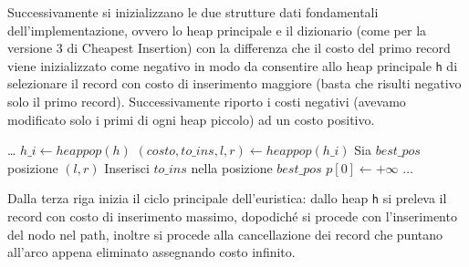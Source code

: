 \documentclass[a4paper,12pt]{report}
\begin{document}
Successivamente si inizializzano le due strutture dati fondamentali dell'implementazione, ovvero lo heap principale e il dizionario (come per la versione 3 di Cheapest Insertion) con la differenza che il costo del primo record viene inizializzato come negativo in modo da consentire allo heap principale \lstinline!h! di selezionare il record con costo di inserimento maggiore (basta che risulti negativo solo il primo record). Successivamente riporto i costi negativi (avevamo modificato solo i primi di ogni heap piccolo) ad un costo positivo.
\begin{tcolorbox}[colframe=black, colback=white, boxrule=0.5pt, title=Furthest Insertion Versione 3, coltitle=black, fonttitle=\bfseries, colbacktitle=white, breakable]
  \begin{algorithmic}[1]
    \State \dots
      \State $h\_i \gets heappop(h)$
      \State $(costo, to\_ins, l, r) \gets heappop(h\_i)$
      \State Sia $best\_pos$ posizione $(l, r)$
      \State Inserisci $to\_ins$ nella posizione $best\_pos$
        \State $p[0] \gets +\infty$
      \EndFor
      \State ...
    \EndWhile
  \end{algorithmic}
\end{tcolorbox}
Dalla terza riga inizia il ciclo principale dell'euristica: dallo heap \lstinline!h! si preleva il record con costo di inserimento massimo, dopodiché si procede con l'inserimento del nodo nel path, inoltre si procede alla cancellazione dei record che puntano all'arco appena eliminato assegnando costo infinito.
\end{document}
